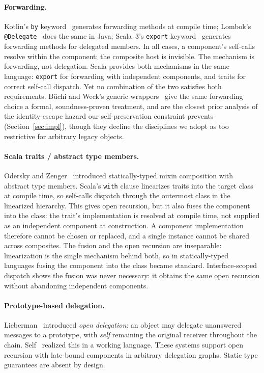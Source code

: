 \documentclass[acmsmall,nonacm]{acmart}
\theoremstyle{acmplain}
\theoremstyle{acmdefinition}
\newcommand{\code}[1]{\texttt{#1}}
\begin{document}
\paragraph{Forwarding.}
Kotlin's \code{by} keyword~\cite{kotlin} generates forwarding methods at compile
time; Lombok's \code{@Delegate}~\cite{lombok} does the same in Java; Scala~3's
\code{export} keyword~\cite{scala3export} generates forwarding methods for
delegated members.
In all cases, a component's self-calls resolve within the component; the composite
host is invisible. The mechanism is forwarding, not delegation. Scala
provides both mechanisms in the same language: \code{export}
for forwarding with independent components, and traits for correct self-call
dispatch. Yet no combination of the two satisfies both requirements.
B\"uchi and Weck's generic wrappers~\cite{buchi2000} give the same forwarding
choice a formal, soundness-proven treatment, and are the closest prior analysis of
the identity-escape hazard our self-preservation constraint prevents
(Section~\ref{sec:impl}), though they decline the disciplines we adopt as too
restrictive for arbitrary legacy objects.

\paragraph{Scala traits / abstract type members.}
Odersky and Zenger~\cite{odersky2005} introduced statically-typed mixin
composition with abstract type members. Scala's \code{with} clause linearizes
traits into the target class at compile time, so self-calls dispatch through the
outermost class in the linearized hierarchy. This gives open recursion, but it
also fuses the component into the class: the trait's implementation is resolved
at compile time, not supplied as an independent component at construction. A component implementation therefore cannot be chosen or replaced, and
a single instance cannot be shared across composites. The fusion and the open recursion are inseparable: linearization is the single
mechanism behind both, so in statically-typed languages fusing the component
into the class became standard. Interface-scoped dispatch shows the fusion
was never necessary: it obtains the same open recursion without abandoning independent components.

\paragraph{Prototype-based delegation.}
Lieberman~\cite{lieberman1986} introduced \emph{open delegation}: an object may
delegate unanswered messages to a prototype, with \emph{self} remaining the
original receiver throughout the chain. Self~\cite{self1987} realized this in a
working language. These systems support open recursion with late-bound
components in arbitrary delegation graphs. Static type guarantees are absent by
design.
\end{document}
